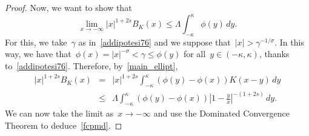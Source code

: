 \documentclass[10pt,a4paper]{amsart}
\begin{document}
\begin{proof}
Now, we want to show that
\begin{equation}\label{fcpmd}
\lim_{x \to - \infty} |x |^{1+2s} B_K(x) \leq  \Lambda \int_{-\kappa}^{\kappa} \phi(y)\, dy.
\end{equation}
For this, we take~$\gamma$ as in~\eqref{addipotesi76}
and we suppose that~$|x|>\gamma^{-1/\sigma}$.
In this way, we have that~$\phi(x)=|x|^{-\sigma}<\gamma\le\phi(y)$
for all~$y\in(-\kappa,\kappa)$,
thanks to~\eqref{addipotesi76}.
Therefore, by~\eqref{main_ellipt},
\begin{eqnarray*}
|x|^{1+2s}B_K(x)&=& |x|^{1+2s}
\int_{-\kappa}^{\kappa} \left( \phi(y) -\phi(x)\right) K(x-y) \, dy\\
&\le& \Lambda \int_{-\kappa}^{\kappa} \left( \phi(y)-\phi(x) \right) \left| 1 -\frac{y}{x} \right|^{-(1+2s)}\, dy.
\end{eqnarray*}
We can now take the limit as~$x\to-\infty$ and use the
Dominated Convergence Theorem to deduce~\eqref{fcpmd}.


\end{proof}
\end{document}
